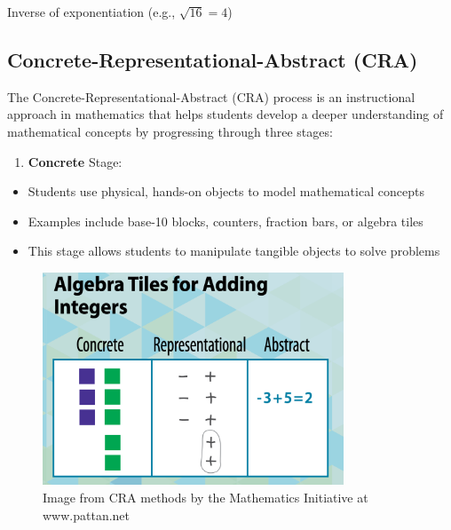 \documentclass[
  letterpaper,
  DIV=11,
  numbers=noendperiod]{scrartcl}
\providecommand{\tightlist}{%
  \setlength{\itemsep}{0pt}\setlength{\parskip}{0pt}}\usepackage{longtable,booktabs,array}
\begin{document}
\begin{tcolorbox}[enhanced jigsaw, rightrule=.15mm, toprule=.15mm, colbacktitle=quarto-callout-tip-color!10!white, title=\textcolor{quarto-callout-tip-color}{\faLightbulb}\hspace{0.5em}{Root extraction (root)}, arc=.35mm, opacityback=0, left=2mm, toptitle=1mm, colback=white, breakable, coltitle=black, leftrule=.75mm, bottomtitle=1mm, titlerule=0mm, bottomrule=.15mm, opacitybacktitle=0.6, colframe=quarto-callout-tip-color-frame]

Inverse of exponentiation (e.g., \(\sqrt{16} = 4\))

\end{tcolorbox}

\subsection{Concrete-Representational-Abstract
(CRA)}\label{concrete-representational-abstract-cra}

The Concrete-Representational-Abstract (CRA) process is an instructional
approach in mathematics that helps students develop a deeper
understanding of mathematical concepts by progressing through three
stages:

\begin{enumerate}
\def\labelenumi{\arabic{enumi}.}
\tightlist
\item
  \textbf{Concrete} Stage:
\end{enumerate}

\begin{itemize}
\tightlist
\item
  Students use physical, hands-on objects to model mathematical concepts
\item
  Examples include base-10 blocks, counters, fraction bars, or algebra
  tiles
\item
  This stage allows students to manipulate tangible objects to solve
  problems
\end{itemize}

\begin{figure}[H]

{\centering \includegraphics[width=0.8\textwidth,height=\textheight]{../img/mod03/cra-algebra-tiles-adding-integers.png}

}

\caption{Image from CRA methods by the Mathematics Initiative at
www.pattan.net}

\end{figure}%
\end{document}
